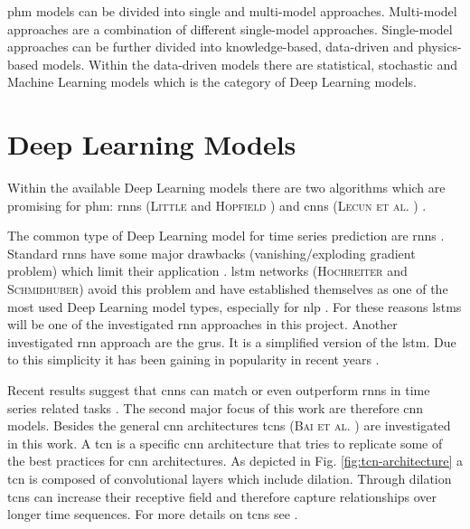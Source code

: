 \documentclass[conference]{IEEEtran}
\begin{document}
\gls{phm} models can be divided into single and multi-model approaches. Multi-model approaches are a combination of different single-model approaches. Single-model approaches can be further divided into knowledge-based, data-driven and physics-based models. Within the data-driven models there are statistical, stochastic and Machine Learning models which is the category of Deep Learning models. \cite{MONTEROJIMENEZ2020539}

\section{Deep Learning Models}
\label{sec:deep-learning-models}

Within the available Deep Learning models there are two algorithms which are promising for \gls{phm}: \glspl{rnn} (\textsc{Little} \cite{Little1996} and \textsc{Hopfield}  \cite{Hopfield1982}) and \glspl{cnn} (\textsc{Lecun et al.} \cite{Lecun1998}) \cite{Akrim2021}.

The common type of Deep Learning model for time series prediction are \glspl{rnn} \cite{Bai2018}. Standard \glspl{rnn} have some major drawbacks (vanishing/exploding gradient problem) which limit their application \cite{Bengio1994}. \gls{lstm} networks (\textsc{Hochreiter} and \textsc{Schmidhuber}) \cite{Hochreiter1997} avoid this problem and have established themselves as one of the most used Deep Learning model types, especially for \gls{nlp} \cite{Wu2016}. For these reasons \glspl{lstm} will be one of the investigated \gls{rnn} approaches in this project. Another investigated \gls{rnn} approach are the \glspl{gru}. It is a simplified version of the \gls{lstm}. Due to this simplicity it has been gaining in popularity in recent years \cite{Rana2016}. 

Recent results suggest that \glspl{cnn} can match or even outperform \glspl{rnn} in time series related tasks \cite{Bai2018}. The second major focus of this work are therefore \gls{cnn} models. Besides the general \gls{cnn} architectures \glspl{tcn} (\textsc{Bai et al.} \cite{Bai2018}) are investigated in this work. A \gls{tcn} is a specific \gls{cnn} architecture that tries to replicate some of the best practices for \gls{cnn} architectures. As depicted in Fig. \ref{fig:tcn-architecture} a \gls{tcn} is composed of convolutional layers which include dilation. Through dilation \glspl{tcn} can increase their receptive field and therefore capture relationships over longer time sequences. For more details on \glspl{tcn} see \cite{Bai2018}.
\end{document}
